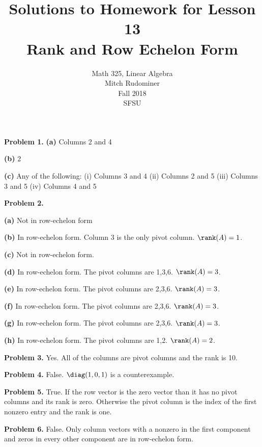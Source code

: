 \documentclass[oneside,12pt]{amsart}
\begin{document}
\title{Solutions to Homework for Lesson 13 \\ Rank and Row Echelon Form}
\author{Math 325, Linear Algebra \\ Mitch Rudominer \\ Fall 2018 \\ SFSU }
\date{}

\maketitle


\textbf{Problem 1.}
\textbf{(a)} Columns 2 and 4

\medskip

\textbf{(b)} 2

\medskip

\textbf{(c)} Any of the following:
(i) Columns 3 and 4
(ii) Columns 2 and 5
(iii) Columns 3 and 5
(iv) Columns 4 and 5

\bigskip

\textbf{Problem 2.}

\medskip


\medskip
\textbf{(a)} Not in row-echelon form

\medskip

\textbf{(b)} In row-echelon form. Column 3 is the only pivot column.
$\rank(A)=1$.

\medskip

\textbf{(c)} Not in row-echelon form.

\medskip

\textbf{(d)} In row-echelon form. The pivot columns are 1,3,6.
$\rank(A)=3$.

\medskip

\textbf{(e)} In row-echelon form. The pivot columns are 2,3,6.
$\rank(A)=3$.

\medskip

\textbf{(f)} In row-echelon form. The pivot columns are 2,3,6.
$\rank(A)=3$.

\medskip

\textbf{(g)} In row-echelon form. The pivot columns are 2,3,6.
$\rank(A)=3$.

\medskip

\textbf{(h)} In row-echelon form. The pivot columns are 1,2.
$\rank(A)=2$.

\bigskip
\bigskip

\textbf{Problem 3.} Yes. All of the columns are pivot columns and the rank is 10.

\bigskip
\bigskip

\textbf{Problem 4.} False. $\diag(1,0,1)$ is a counterexample.

\bigskip
\bigskip

\textbf{Problem 5.} True. If the row vector is the zero vector than it has no
pivot columns and its rank is zero. Otherwise the pivot column is the
index of the first nonzero entry and the rank is one.

\bigskip
\bigskip

\textbf{Problem 6.} False. Only column vectors with a nonzero in the first component
and zeros in every other component are in row-echelon form.
\end{document}
